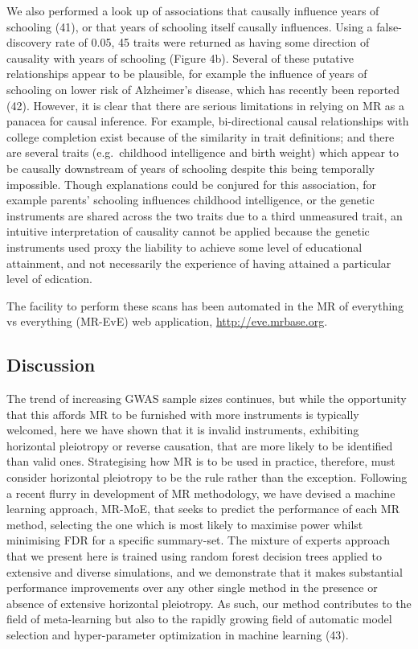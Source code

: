 \documentclass[]{article}
\begin{document}
We also performed a look up of associations that causally influence
years of schooling (41), or that years of schooling itself causally
influences. Using a false-discovery rate of 0.05, 45 traits were
returned as having some direction of causality with years of schooling
(Figure 4b). Several of these putative relationships appear to be
plausible, for example the influence of years of schooling on lower risk
of Alzheimer's disease, which has recently been reported (42). However,
it is clear that there are serious limitations in relying on MR as a
panacea for causal inference. For example, bi-directional causal
relationships with college completion exist because of the similarity in
trait definitions; and there are several traits (e.g.~childhood
intelligence and birth weight) which appear to be causally downstream of
years of schooling despite this being temporally impossible. Though
explanations could be conjured for this association, for example
parents' schooling influences childhood intelligence, or the genetic
instruments are shared across the two traits due to a third unmeasured
trait, an intuitive interpretation of causality cannot be applied
because the genetic instruments used proxy the liability to achieve some
level of educational attainment, and not necessarily the experience of
having attained a particular level of edication.

The facility to perform these scans has been automated in the MR of
everything vs everything (MR-EvE) web application,
\url{http://eve.mrbase.org}.

\subsection{Discussion}\label{discussion}

The trend of increasing GWAS sample sizes continues, but while the
opportunity that this affords MR to be furnished with more instruments
is typically welcomed, here we have shown that it is invalid
instruments, exhibiting horizontal pleiotropy or reverse causation, that
are more likely to be identified than valid ones. Strategising how MR is
to be used in practice, therefore, must consider horizontal pleiotropy
to be the rule rather than the exception. Following a recent flurry in
development of MR methodology, we have devised a machine learning
approach, MR-MoE, that seeks to predict the performance of each MR
method, selecting the one which is most likely to maximise power whilst
minimising FDR for a specific summary-set. The mixture of experts
approach that we present here is trained using random forest decision
trees applied to extensive and diverse simulations, and we demonstrate
that it makes substantial performance improvements over any other single
method in the presence or absence of extensive horizontal pleiotropy. As
such, our method contributes to the field of meta-learning but also to
the rapidly growing field of automatic model selection and
hyper-parameter optimization in machine learning (43).
\end{document}
